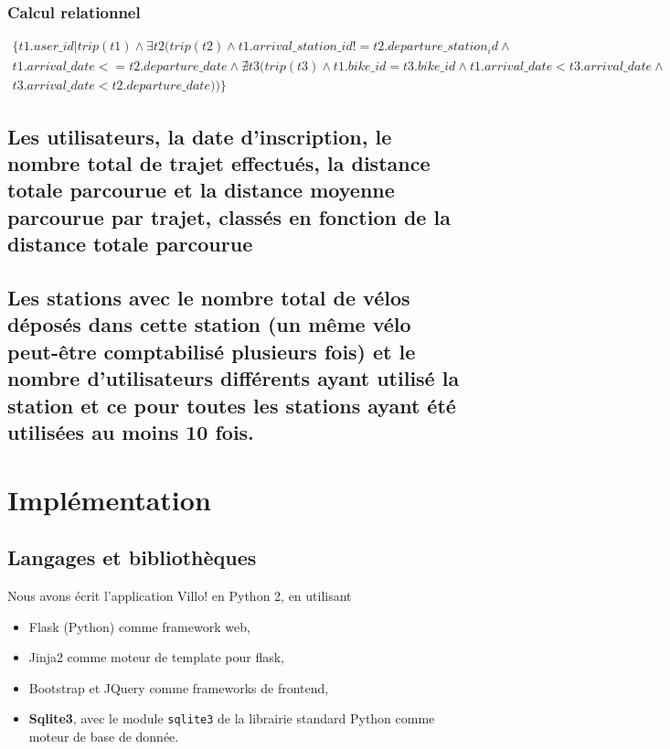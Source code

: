 \documentclass[a4paper,10pt]{article}
\begin{document}
\subsubsection{Calcul relationnel}
\begin{align}
	\{ t1.user\_id | trip(t1) \wedge \exists t2 (trip(t2) \wedge t1.arrival\_station\_id != t2.departure\_station_id \wedge \\ t1.arrival\_date <= t2.departure\_date  \wedge \nexists t3 (trip(t3) \wedge t1.bike\_id = t3.bike\_id \wedge t1.arrival\_date < t3.arrival\_date \wedge \\ t3.arrival\_date < t2.departure\_date)) \}
\end{align}


\pagebreak
\subsection{Les utilisateurs, la date d'inscription, le nombre total de trajet effectués, la distance totale parcourue et la distance moyenne parcourue par trajet, classés en fonction de la distance totale parcourue}


\pagebreak
\subsection{Les stations avec le nombre total de vélos déposés dans cette station (un même vélo peut-être comptabilisé plusieurs fois) et le nombre d'utilisateurs différents ayant utilisé la station et ce pour toutes les stations ayant été utilisées au moins 10 fois.}


\pagebreak
\section{Implémentation}
\subsection{Langages et bibliothèques}

Nous avons écrit l'application Villo! en Python 2, en utilisant
\begin{itemize}
	\item Flask (Python) comme framework web,
	\item Jinja2 comme moteur de template pour flask,
	\item Bootstrap et JQuery comme frameworks de frontend,
	\item \textbf{Sqlite3}, avec le module \texttt{sqlite3} de la librairie standard Python comme moteur de base de donnée.
\end{itemize}
\end{document}
